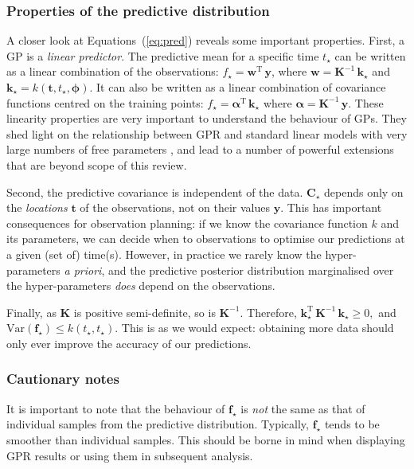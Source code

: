 \documentclass[letterpaper]{ar-1col}
\newcommand{\hyperparams}{\ensuremath{\boldsymbol{\phi}}}
\begin{document}
\subsubsection{Properties of the  predictive distribution}
A closer look at Equations~(\ref{eq:pred}) reveals some important properties.
First, a GP is a \textit{linear predictor}. The predictive mean for a specific time $t_\star$ can be written as a linear combination of the observations:
$f_\star = \mathbf{w}^{\mathrm{T}} \, \mathbf{y}$, where $\mathbf{w} = \mathbf{K}^{-1} \, \mathbf{k}_\star$ and $\mathbf{k}_\star=k(\mathbf{t},t_\star,\hyperparams)$. It can also be written as
a linear combination of covariance functions centred on the training points:
$f_\star = \mathbf{\alpha}^\mathrm{T} \,  \mathbf{k}_\star$ where $\mathbf{\alpha} = \mathbf{K}^{-1} \, \mathbf{y}$.
These linearity properties are very important to understand the behaviour of GPs. They shed light on the relationship between GPR and standard linear models with very large numbers of free parameters \citep[see e.g.][for a more detailed discussion]{2021PASP..133i3001H},
and lead to a number of powerful extensions that are beyond  scope of this review.

Second, the predictive covariance is independent of the data. $\mathbf{C}_\star$ depends only on the \emph{locations} $\mathbf{t}$ of the observations, not on their values $\mathbf{y}$. This has important consequences for observation planning: if we know the covariance function $k$ and its parameters, we can decide when to observations to optimise our predictions at a given (set of) time(s). However, in practice we rarely know the hyper-parameters \textit{a priori}, and the predictive posterior distribution marginalised over the hyper-parameters \textit{does} depend on the observations.

Finally, as $\mathbf{K}$ is positive semi-definite, so is $\mathbf{K}^{-1}$. Therefore, $\mathbf{k}_\star^{\mathrm{T}} \, \mathbf{K}^{-1} \, \mathbf{k}_\star \ge 0,$ and $\mathrm{Var}(\mathbf{f}_\star) \leq k(t_\star,t_\star)$. This is as we would expect: obtaining more data should only ever improve the accuracy of our predictions.

\subsubsection{Cautionary notes}

It is important to note that the behaviour of $\mathbf{f}_\star$ is \emph{not} the same as that of individual samples from the predictive distribution. Typically,  $\mathbf{f}_\star$ tends to be smoother than individual samples. This should be borne in mind when displaying GPR results or using them in subsequent analysis.
\end{document}
